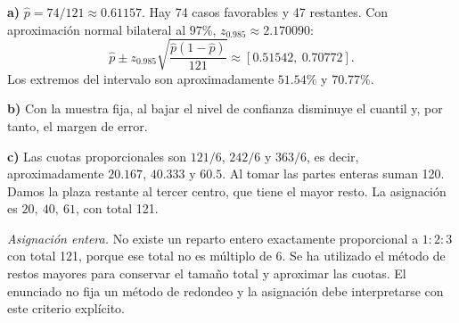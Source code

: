 \textbf{a)} $\hat p=74/121\approx0.61157$. Hay 74 casos
favorables y 47 restantes. Con aproximación normal bilateral
al $97\%$, $z_{0.985}\approx2.170090$:
\[
\hat p\pm z_{0.985}\sqrt{\frac{\hat p(1-\hat p)}{121}}
\approx\boxed{[0.51542,\ 0.70772]}.
\]
Los extremos del intervalo son aproximadamente $51.54\%$ y $70.77\%$.

\textbf{b)} Con la muestra fija, al bajar el nivel de confianza
disminuye el cuantil y, por tanto, el margen de error.

\textbf{c)} Las cuotas proporcionales son
$121/6$, $242/6$ y $363/6$, es decir, aproximadamente
$20.167$, $40.333$ y $60.5$. Al tomar las partes enteras suman 120.
Damos la plaza restante al tercer centro, que tiene el mayor
resto. La asignación es $\boxed{20,\ 40,\ 61}$, con total 121.

\textit{Asignación entera.} No existe un reparto entero exactamente
proporcional a $1:2:3$ con total 121, porque ese total no es múltiplo
de 6. Se ha utilizado el método de restos mayores para conservar el
tamaño total y aproximar las cuotas. El enunciado no fija un método
de redondeo y la asignación debe interpretarse con este criterio explícito.

